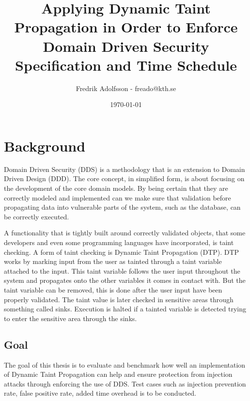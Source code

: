 \documentclass{../kththesis}
\title{Applying Dynamic Taint Propagation in Order to Enforce Domain Driven Security \\
        \large Specification and Time Schedule}
\author{Fredrik Adolfsson - freado@kth.se}
\date{\today}
\begin{document}
\frontmatter


\titlepage


\tableofcontents


\mainmatter



\chapter{Background}
Domain Driven Security (DDS) is a methodology that is an extension to Domain Driven Design (DDD). The core concept, in simplified form, is about focusing on the development of the core domain models. By being certain that they are correctly modeled and implemented can we make sure that validation before propagating data into vulnerable parts of the system, such as the database, can be correctly executed. \parencite{evans_2015, EvansEric2004Dd:t, Wilander2009, Johnsson2009}

A functionality that is tightly built around correctly validated objects, that some developers and even some programming languages have incorporated, is taint checking. \parencite{perl, ruby, Clause2007} A form of taint checking is Dynamic Taint Propagation (DTP). DTP works by marking input from the user as tainted through a taint variable attached to the input. This taint variable follows the user input throughout the system and propagates onto the other variables it comes in contact with. But the taint variable can be removed, this is done after the user input have been properly validated. The taint value is later checked in sensitive areas through something called sinks. Execution is halted if a tainted variable is detected trying to enter the sensitive area through the sinks.  \parencite{Pan2015, Venkataramani2008}


\section{Goal}
The goal of this thesis is to evaluate and benchmark how well an implementation of Dynamic Taint Propagation can help and ensure protection from injection attacks through enforcing the use of DDS. Test cases such as injection prevention rate, false positive rate, added time overhead is to be conducted.
\end{document}

